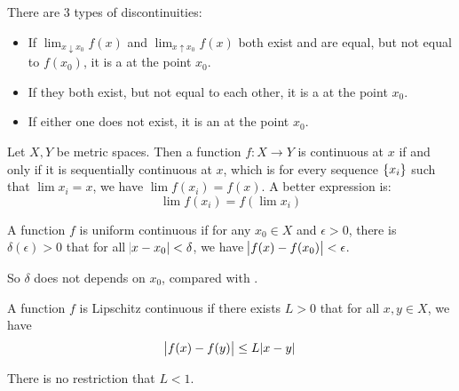 \begin{definition}
    There are 3 types of discontinuities:
    \begin{itemize}
        \item If $\lim_{x \downarrow x_0} f(x)$ and $\lim_{x \uparrow x_0} f(x)$ both exist and are equal, but not equal to $f(x_0)$, it is a  at the point $x_0$.
        \item If they both exist, but not equal to each other, it is a  at the point $x_0$.
        \item If either one does not exist, it is an  at the point $x_0$.
    \end{itemize}
\end{definition}


\begin{theorem}
    Let $X,Y$ be metric spaces. Then a function $f: X\rightarrow Y$ is continuous at $x$ if and only if it is sequentially continuous at $x$, which is for every sequence $\set{x_i}$ such that $\lim x_i = x$, we have $\lim f(x_i) = f(x)$. A better expression is:
    \begin{equation}
        \lim f(x_i) = f(\lim x_i )
    \end{equation}
\end{theorem}



\begin{definition}
    A function $f$ is uniform continuous if for any $x_0 \in X$ and $\epsilon > 0$, there is $\delta(\epsilon) > 0$ that for all $\abs{x - x_0} < \delta$, we have $\abs{f(x) - f(x_0)} < \epsilon$.
    
    So $\delta$ does not depends on $x_0$, compared with .
\end{definition}

\begin{definition}\label{lipschitz_continuity}
    A function $f$ is Lipschitz continuous if there exists $L > 0$ that for all $x,y \in X$, we have 
    \begin{equation}
        \abs{f(x) - f(y)} \leq L \abs{x - y}
    \end{equation}
    
    There is no restriction that $L < 1$.
\end{definition}

